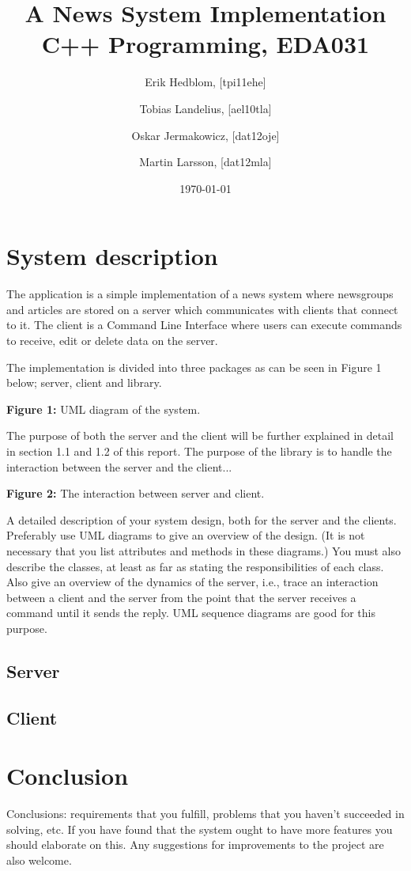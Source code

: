 \documentclass[a4paper]{article}
\title{A News System Implementation \\ C++ Programming, EDA031}
\author{Erik Hedblom, [tpi11ehe]
\and Tobias Landelius, [ael10tla]
\and Oskar Jermakowicz, [dat12oje]
\and Martin Larsson, [dat12mla]}
\date{\today}
\begin{document}
\maketitle

\newpage

\section{System description}
The application is a simple implementation of a news system where newsgroups and articles are stored on a server which communicates with clients that connect to it. The client is a Command Line Interface where users can execute commands to receive, edit or delete data on the server.

The implementation is divided into three packages as can be seen in Figure 1 below; server, client and library.

\begin{center}
\textbf{Figure 1:} UML diagram of the system.
\end{center}

The purpose of both the server and the client will be further explained in detail in section 1.1 and 1.2 of this report. The purpose of the library is to handle the interaction between the server and the client...

\begin{center}
\textbf{Figure 2:} The interaction between server and client.
\end{center}

A detailed description of your system design, both for the server and the clients. Preferably
use UML diagrams to give an overview of the design. (It is not necessary that you list
attributes and methods in these diagrams.) You must also describe the classes, at least as
far as stating the responsibilities of each class.
Also give an overview of the dynamics of the server, i.e., trace an interaction between a
client and the server from the point that the server receives a command until it sends the
reply. UML sequence diagrams are good for this purpose.

\subsection{Server}

\subsection{Client}

\section{Conclusion}

Conclusions: requirements that you fulfill, problems that you haven’t succeeded in solving,
etc. If you have found that the system ought to have more features you should elaborate on
this. Any suggestions for improvements to the project are also welcome.
\end{document}

